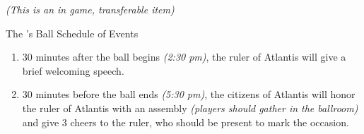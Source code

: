\documentclass[white]{guildcamp1}
\begin{document}
\name{\wProphesy{}}

\emph{(This is an in game, transferable item)}

\begin{center}The \cKing{\MYname{}}'s Ball Schedule of Events \end{center}

\begin{enumerate}
\item 30 minutes after the ball begins {\it(2:30 pm)}, the ruler of Atlantis will give a brief welcoming speech.
\item 30 minutes before the ball ends {\it(5:30 pm)}, the citizens of Atlantis will honor the ruler of Atlantis with an assembly {\it(players should gather in the ballroom)} and give 3 cheers to the ruler, who should be present to mark the occasion.
\end{enumerate}
\end{document}
